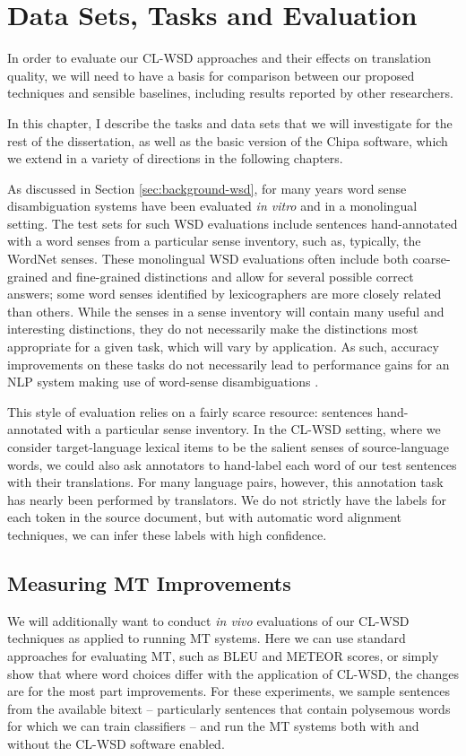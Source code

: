 \chapter{Data Sets, Tasks and Evaluation}
\label{chap:evaluation}
In order to evaluate our CL-WSD approaches and their effects on translation
quality, we will need to have a basis for comparison between our proposed
techniques and sensible baselines, including results reported by other
researchers.

In this chapter, I describe the tasks and data sets that we will investigate
for the rest of the dissertation, as well as the basic version of the Chipa
software, which we extend in a variety of directions in the following chapters.

As discussed in Section \ref{sec:background-wsd}, for many years word sense
disambiguation systems have been evaluated \emph{in vitro} and in a monolingual
setting. The test sets for such WSD evaluations include sentences
hand-annotated with a word senses from a particular sense inventory, such as,
typically, the WordNet senses. These monolingual WSD evaluations often include
both coarse-grained and fine-grained distinctions and allow for several
possible correct answers; some word senses identified by lexicographers are
more closely related than others.  While the senses in a sense inventory will
contain many useful and interesting distinctions, they do not necessarily make
the distinctions most appropriate for a given task, which will vary by
application. As such, accuracy improvements on these tasks do not necessarily
lead to performance gains for an NLP system making use of word-sense
disambiguations \cite{resnikwsdapplications}.

This style of evaluation relies on a fairly scarce resource: sentences
hand-annotated with a particular sense inventory.
In the CL-WSD setting, where we consider target-language lexical items to be
the salient senses of source-language words, we could also ask annotators to
hand-label each word of our test sentences with their translations.
For many language pairs, however, this annotation task has nearly been
performed by translators. We do not strictly have the labels for each token in
the source document, but with automatic word alignment techniques, we can infer
these labels with high confidence.

\section{Measuring MT Improvements}
We will additionally want to conduct \emph{in vivo} evaluations of our CL-WSD
techniques as applied to running MT systems. Here we can use standard
approaches for evaluating MT, such as BLEU and METEOR scores, or simply show
that where word choices differ with the application of CL-WSD, the changes are
for the most part improvements. For these experiments, we sample sentences
from the available bitext -- particularly sentences that contain polysemous
words for which we can train classifiers -- and run the MT systems both with
and without the CL-WSD software enabled.

